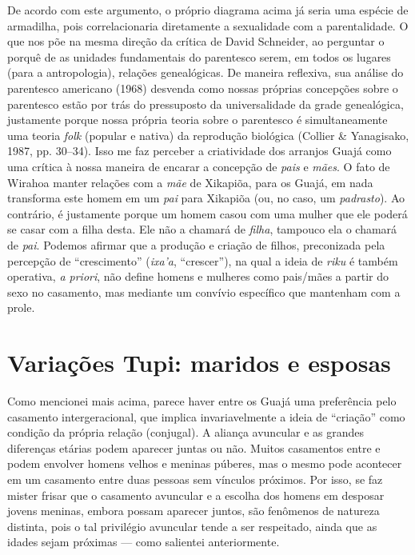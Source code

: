 De acordo com este argumento, o próprio diagrama acima já seria uma
espécie de armadilha, pois correlacionaria diretamente a sexualidade com
a parentalidade. O que nos põe na mesma direção da crítica de David
Schneider, ao perguntar o porquê de as unidades fundamentais do
parentesco serem, em todos os lugares (para a antropologia), relações
genealógicas. De maneira reflexiva, sua análise do parentesco americano
(1968) desvenda como nossas próprias concepções sobre o parentesco estão
por trás do pressuposto da universalidade da grade genealógica,
justamente porque nossa própria teoria sobre o parentesco é
simultaneamente uma teoria \emph{folk} (popular e nativa) da reprodução
biológica (Collier \& Yanagisako, 1987, pp. 30--34). Isso me faz perceber a
criatividade dos arranjos Guajá como uma crítica à nossa maneira de
encarar a concepção de \emph{pais} e \emph{mães}. O fato de Wirahoa
manter relações com a \emph{mãe} de Xikapiõa, para os Guajá, em nada
transforma este homem em um \emph{pai} para Xikapiõa (ou, no caso, um
\emph{padrasto}). Ao contrário, é justamente porque um homem casou com
uma mulher que ele poderá se casar com a filha desta. Ele não a chamará
de \emph{filha}, tampouco ela o chamará de \emph{pai}. Podemos afirmar
que a produção e criação de filhos, preconizada pela percepção de
``crescimento'' (\emph{ixa'a}, ``crescer''), na qual a ideia de
\emph{riku} é também operativa, \emph{a priori}, não define homens e
mulheres como pais/mães a partir do sexo no casamento, mas mediante um
convívio específico que mantenham com a prole.

\section{Variações Tupi: maridos e esposas}\label{variauxe7uxf5es-tupi-maridos-e-esposas}

Como mencionei mais acima, parece haver entre os Guajá uma preferência
pelo casamento intergeracional, que implica invariavelmente a ideia de
``criação'' como condição da própria relação (conjugal). A aliança
avuncular e as grandes diferenças etárias podem aparecer juntas ou não.
Muitos casamentos entre  e  podem envolver homens velhos e meninas
púberes, mas o mesmo pode acontecer em um casamento entre duas pessoas
sem vínculos próximos. Por isso, se faz mister frisar que o casamento
avuncular e a escolha dos homens em desposar jovens meninas, embora
possam aparecer juntos, são fenômenos de natureza distinta, pois o tal
privilégio avuncular tende a ser respeitado, ainda que as idades sejam
próximas --- como salientei anteriormente.

